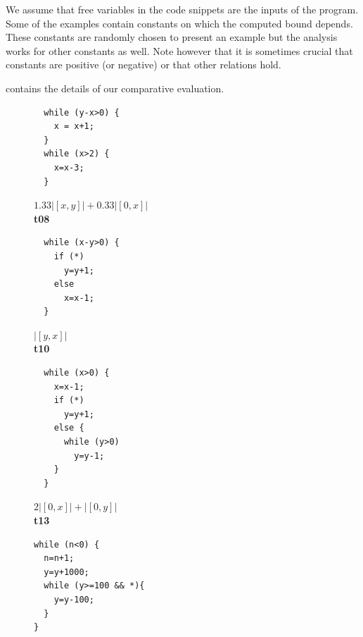 \documentclass[nocopyrightspace,preprint,pldi]{sigplanconf-pldi15}
\newcommand{\pref}[1]{\prettyref{#1}}
\begin{document}
{We assume that free variables in the code snippets are the inputs of
the program. Some of the examples contain constants on which the
computed bound depends.  These constants are randomly chosen to
present an example but the analysis works for other constants as well.
Note however that it is sometimes crucial that constants are positive
(or negative) or that other relations hold.

\pref{tab:eval} contains the details of our comparative evaluation.


\begin{figure}[t!]
\setlength{\progwidth}{.24\linewidth}
  \centering

  \begin{minipage}[b]{\progwidth}
    \begin{center}
   \begin{lstlisting}
  while (y-x>0) {
    x = x+1;
  }
  while (x>2) {
    x=x-3;
  }
   \end{lstlisting}

$1.33|[x,y]| + 0.33|[0,x]|$
\\[.7\baselineskip]
      {\bf t08}
    \end{center}
  \end{minipage}
%
%
%
  \begin{minipage}[b]{\progwidth}
    \begin{center}
   \begin{lstlisting}
  while (x-y>0) {
    if (*)
      y=y+1;
    else
      x=x-1;
  }
   \end{lstlisting}

$|[y,x]|$
\\[.7\baselineskip]
      {\bf t10}
    \end{center}
  \end{minipage}
%
%
%
  \begin{minipage}[b]{\progwidth}
    \begin{center}
   \begin{lstlisting}
  while (x>0) {
    x=x-1;
    if (*)
      y=y+1;
    else {
      while (y>0)
        y=y-1;
    }
  }
   \end{lstlisting}

$2|[0,x]| + |[0,y]|$
\\[.7\baselineskip]
      {\bf t13}
    \end{center}
  \end{minipage}
%
%
%
  \begin{minipage}[b]{\progwidth}
    \begin{center}
   \begin{lstlisting}
while (n<0) {
  n=n+1;
  y=y+1000;
  while (y>=100 && *){
    y=y-100;
  }
}
   \end{lstlisting}


\end{center}
\end{minipage}
\end{figure}}
\end{document}
